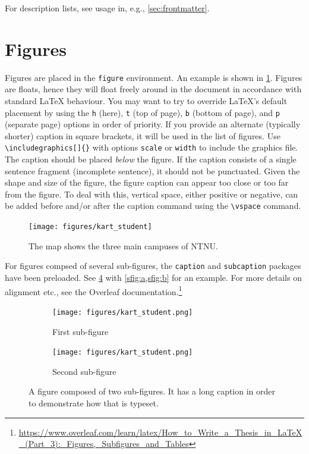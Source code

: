 For description lists, see usage in, e.g., \cref{sec:frontmatter}.

\section{Figures}

Figures are placed in the \texttt{figure} environment. An example is shown in \cref{fig:mapNTNU}. Figures are floats, hence they will float freely around in the document in accordance with standard \LaTeX{} behaviour. You may want to try to override \LaTeX{}'s default placement by using the \texttt{h} (here), \texttt{t} (top of page), \texttt{b} (bottom of page), and \texttt{p} (separate page) options in order of priority. If you provide an alternate (typically shorter) caption in square brackets, it will be used in the list of figures. Use \texttt{\textbackslash includegraphics[]\{\}} with options \texttt{scale} or \texttt{width} to include the graphics file. The caption should be placed \emph{below} the figure. If the caption consists of a single sentence fragment (incomplete sentence), it should not be punctuated. Given the shape and size of the figure, the figure caption can appear too close or too far from the figure. To deal with this, vertical space, either positive or negative, can be added before and/or after the caption command using the \texttt{\textbackslash vspace{}} command.

\begin{figure}[htbp]  %
  \centering
  \texttt{[image: figures/kart\_student]}
  \caption[Map of NTNU Campuses]{The map shows the three main campuses of NTNU.}
  \label{fig:mapNTNU}
\end{figure}

For figures compsed of several sub-figures, the \texttt{caption} and \texttt{subcaption} packages have been preloaded. See \cref{fig:subfig} with \cref{sfig:a,sfig:b} for an example. For more details on alignment etc., see the Overleaf documentation.\footnote{\url{https://www.overleaf.com/learn/latex/How_to_Write_a_Thesis_in_LaTeX_(Part_3):_Figures,_Subfigures_and_Tables}}

\begin{figure}
    \centering
    \begin{subfigure}[b]{.45\textwidth}
        \centering
        \texttt{[image: figures/kart\_student.png]}
        \caption{First sub-figure}
        \label{sfig:a}
    \end{subfigure}
    \hfill
    \begin{subfigure}[b]{.45\textwidth}
        \centering
        \texttt{[image: figures/kart\_student.png]}
        \caption{Second sub-figure}
        \label{sfig:b}
    \end{subfigure}
    \caption{A figure composed of two sub-figures. It has a long caption in order to demonstrate how that is typeset.}
    \label{fig:subfig}
\end{figure}

